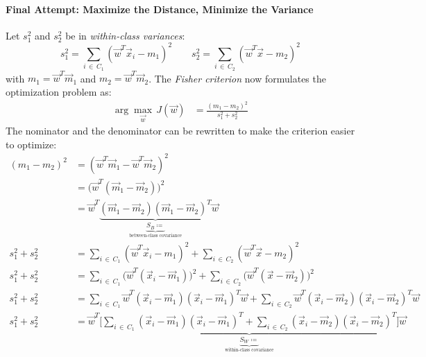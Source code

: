 		\paragraph{Final Attempt: Maximize the Distance, Minimize the Variance}
			Let \( s_1^2 \) and \( s_2^2 \) be in \emph{within-class variances}:
			\begin{equation}
				s_1^2 = \sum_{i \,\in\, C_1} (\vec{w}^T \vec{x}_i - m_1)^2 \qquad s_2^2 = \sum_{i \,\in\, C_2} (\vec{w}^T \vec{x} - m_2)^2
			\end{equation}
			with \( m_1 = \vec{w}^T \vec{m}_1 \) and \( m_2 = \vec{w}^T \vec{m}_2 \). The \emph{Fisher criterion} now formulates the optimization problem as:
			\begin{align}
				\arg\max\limits_{\vec{w}} \, J(\vec{w}) & = \frac{(m_1 - m_2)^2}{s_1^2 + s_2^2}
			\end{align}
			The nominator and the denominator can be rewritten to make the criterion easier to optimize:
			\begin{align}
				(m_1 - m_2)^2 & = (\vec{w}^T \vec{m}_1 - \vec{w}^T \vec{m}_2)^2                                                                                                                                                                                                                \\
				              & = \big(\vec{w}^T (\vec{m}_1 - \vec{m}_2)\big)^2                                                                                                                                                                                                                \\
				              & = \vec{w}^T \underbrace{(\vec{m}_1 - \vec{m}_2) (\vec{m}_1 - \vec{m}_2)^T}_{\underbrace{S_B \coloneqq}_{\textrm{between-class covariance}}} \vec{w}                                                                                                            \\
				s_1^2 + s_2^2 & = \sum_{i \,\in\, C_1} (\vec{w}^T \vec{x}_i - m_1)^2 + \sum_{i \,\in\, C_2} (\vec{w}^T \vec{x} - m_2)^2                                                                                                                                                        \\
				s_1^2 + s_2^2 & = \sum_{i \,\in\, C_1} \big(\vec{w}^T (\vec{x}_i - \vec{m}_1)\big)^2 + \sum_{i \,\in\, C_2} \big(\vec{w}^T (\vec{x} - \vec{m}_2)\big)^2                                                                                                                        \\
				s_1^2 + s_2^2 & = \sum_{i \,\in\, C_1} \vec{w}^T (\vec{x}_i - \vec{m}_1) (\vec{x}_i - \vec{m}_1)^T \vec{w} + \sum_{i \,\in\, C_2} \vec{w}^T (\vec{x}_i - \vec{m}_2) (\vec{x}_i - \vec{m}_2)^T \vec{w}                                                                          \\
				s_1^2 + s_2^2 & = \vec{w}^T \underbrace{\Bigg[ \sum_{i \,\in\, C_1} (\vec{x}_i - \vec{m}_1) (\vec{x}_i - \vec{m}_1)^T + \sum_{i \,\in\, C_2} (\vec{x}_i - \vec{m}_2) (\vec{x}_i - \vec{m}_2)^T \Bigg]}_{\underbrace{S_W \coloneqq}_{\textrm{within-class covariance}}} \vec{w}
			\end{align}
